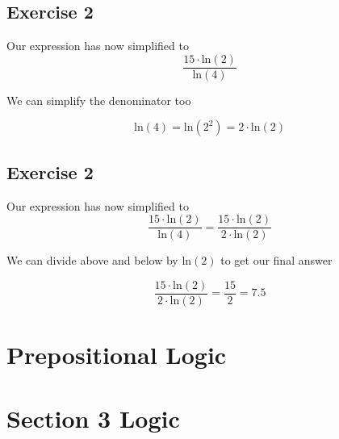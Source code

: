 \documentclass[]{report}
\begin{document}

\subsection{Exercise 2}

Our expression has now simplified to 
\[\frac{15 \cdot \mbox{ln}(2) }{\mbox{ln}(4)} \]

We can simplify the denominator too

\[ \mbox{ln}(4) =  \mbox{ln}(2^2) = 2 \cdot \mbox{ln}(2) \]



\subsection{Exercise 2}

Our expression has now simplified to 
\[\frac{15 \cdot \mbox{ln}(2) }{\mbox{ln}(4)} = \frac{15 \cdot \mbox{ln}(2) }{2 \cdot \mbox{ln}(2)} \]

We can divide above and below by $\mbox{ln}(2)$ to get our final answer


\[ \frac{15 \cdot \mbox{ln}(2) }{2 \cdot \mbox{ln}(2)} = \frac{15}{2} = 7.5 \]


\section*{Prepositional Logic}


\newpage
\section{Section 3 Logic}
\end{document}
